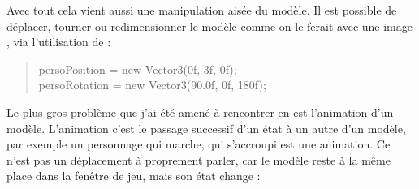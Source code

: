 \documentclass{article}
\begin{document}
Avec tout cela vient aussi une manipulation aisée du modèle. Il est possible de déplacer, tourner ou redimensionner le modèle  comme on le ferait avec une image , via l'utilisation de  : 
\begin{quote}
persoPosition = new Vector3(0f, 3f, 0f);\\
persoRotation = new Vector3(90.0f, 0f, 180f);
\end{quote}

Le plus gros problème que j'ai été amené à rencontrer en  est l'animation d'un modèle. L'animation c'est le passage successif d'un état à un autre d'un modèle, par exemple un personnage qui marche, qui s'accroupi est une animation. Ce n'est pas un déplacement à proprement parler, car le modèle  reste à la même place dans la fenêtre de jeu, mais son état change : 
\end{document}
